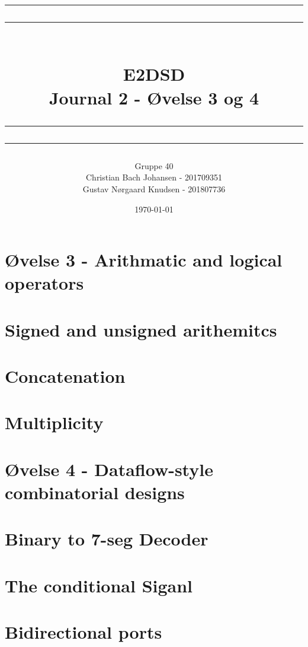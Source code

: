 \documentclass[12pt,a4paper]{article}
\newcommand\mymaketitle[1]{
   \rule{\textwidth}{1.6pt}\vspace*{-\baselineskip}\vspace*{2pt}
   \rule{\textwidth}{0.4pt}
   \\  
   \huge \bf #1\\
   \vspace{-8pt}
   \rule{\textwidth}{0.4pt}\vspace*{-\baselineskip}\vspace{3.2pt}
   \rule{\textwidth}{1.6pt}
}
\begin{document}
\title{
	\mymaketitle{E2DSD\\Journal 2 - Øvelse 3 og 4}
}
\author{
	Gruppe 40\\
	Christian Bach Johansen - 201709351\\
	Gustav Nørgaard Knudsen - 201807736
}
\date{\today}

\maketitle


\section*{Øvelse 3 - Arithmatic and logical operators}
\section{Signed and unsigned arithemitcs}


\section{Concatenation}


\section{Multiplicity}


\section*{Øvelse 4 - Dataflow-style combinatorial designs}
\section{Binary to 7-seg Decoder}


\section{The conditional Siganl}


\section{Bidirectional ports}

\end{document}
